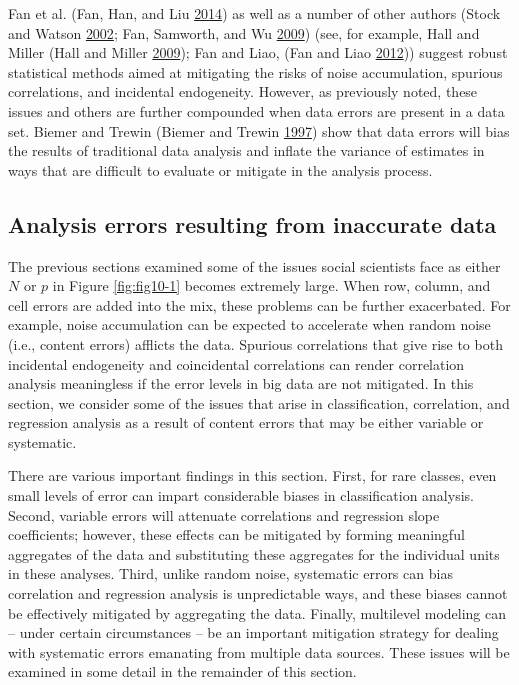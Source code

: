 \documentclass[]{krantz}
\begin{document}
Fan et al. (Fan, Han, and Liu
\protect\hyperlink{ref-fan2014challenges}{2014}) as well as a number of
other authors (Stock and Watson
\protect\hyperlink{ref-stock2002forecasting}{2002}; Fan, Samworth, and
Wu \protect\hyperlink{ref-fan2009ultrahigh}{2009}) (see, for example,
Hall and Miller (Hall and Miller
\protect\hyperlink{ref-HallMiller2009}{2009}); Fan and Liao, (Fan and
Liao \protect\hyperlink{ref-FanLiao2012}{2012})) suggest robust
statistical methods aimed at mitigating the risks of noise accumulation,
spurious correlations, and incidental endogeneity. However, as
previously noted, these issues and others are further compounded when
data errors are present in a data set. Biemer and Trewin (Biemer and
Trewin \protect\hyperlink{ref-biemer1997review}{1997}) show that data
errors will bias the results of traditional data analysis and inflate
the variance of estimates in ways that are difficult to evaluate or
mitigate in the analysis process.

\subsection{Analysis errors resulting from inaccurate
data}\label{sec:10-4.2}

The previous sections examined some of the issues social scientists face
as either \(N\) or \(p\) in Figure \ref{fig:fig10-1} becomes extremely
large. When row, column, and cell errors are added into the mix, these
problems can be further exacerbated. For example, noise accumulation can
be expected to accelerate when random noise (i.e., content errors)
afflicts the data. Spurious correlations that give rise to both
incidental endogeneity and coincidental correlations can render
correlation analysis meaningless if the error levels in big data are not
mitigated. In this section, we consider some of the issues that arise in
classification, correlation, and regression analysis as a result of
content errors that may be either variable or systematic.

There are various important findings in this section. First, for rare
classes, even small levels of error can impart considerable biases in
classification analysis. Second, variable errors will attenuate
correlations and regression slope coefficients; however, these effects
can be mitigated by forming meaningful aggregates of the data and
substituting these aggregates for the individual units in these
analyses. Third, unlike random noise, systematic errors can bias
correlation and regression analysis is unpredictable ways, and these
biases cannot be effectively mitigated by aggregating the data. Finally,
multilevel modeling can -- under certain circumstances -- be an
important mitigation strategy for dealing with systematic errors
emanating from multiple data sources. These issues will be examined in
some detail in the remainder of this section.
\end{document}
